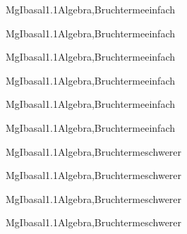 \documentclass[12pt]{article}
\begin{document}
    \begin{Add}{MgI}{basal1.1}{Algebra,Bruchterme}{einfach}
    \solution{ }
    \end{Add}
    \begin{Add}{MgI}{basal1.1}{Algebra,Bruchterme}{einfach}
    \end{Add}
    

    \begin{Add}{MgI}{basal1.1}{Algebra,Bruchterme}{einfach}
    \solution{ }
    \end{Add}
    \begin{Add}{MgI}{basal1.1}{Algebra,Bruchterme}{einfach}
    \end{Add}
    

    \begin{Add}{MgI}{basal1.1}{Algebra,Bruchterme}{einfach}
    \solution{ }
    \end{Add}
    \begin{Add}{MgI}{basal1.1}{Algebra,Bruchterme}{einfach}
    \end{Add}
    

    \begin{Add}{MgI}{basal1.1}{Algebra,Bruchterme}{schwerer}
    \solution{ }
    \end{Add}
    \begin{Add}{MgI}{basal1.1}{Algebra,Bruchterme}{schwerer}
    \end{Add}
    

    \begin{Add}{MgI}{basal1.1}{Algebra,Bruchterme}{schwerer}
    \solution{ }
    \end{Add}
    \begin{Add}{MgI}{basal1.1}{Algebra,Bruchterme}{schwerer}
    \end{Add}
    
\end{document}
